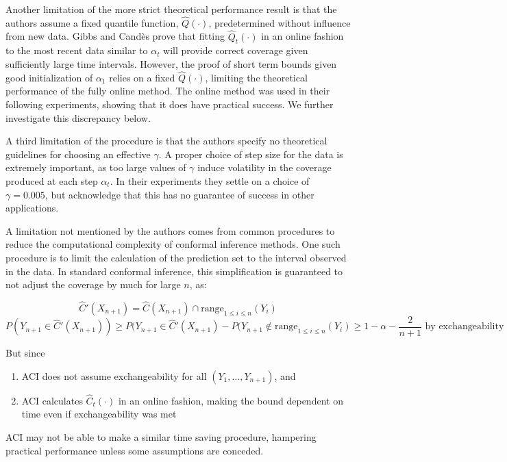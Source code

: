\documentclass[
]{article}
\providecommand{\tightlist}{%
  \setlength{\itemsep}{0pt}\setlength{\parskip}{0pt}}
\begin{document}
Another limitation of the more strict theoretical performance result is
that the authors assume a fixed quantile function, \(\hat{Q}(\cdot)\),
predetermined without influence from new data. Gibbs and Candès prove
that fitting \(\hat{Q}_t(\cdot)\) in an online fashion to the most
recent data similar to \(\alpha_t\) will provide correct coverage given
sufficiently large time intervals. However, the proof of short term
bounds given good initialization of \(\alpha_1\) relies on a fixed
\(\hat{Q}(\cdot)\), limiting the theoretical performance of the fully
online method. The online method was used in their following
experiments, showing that it does have practical success. We further
investigate this discrepancy below.

A third limitation of the procedure is that the authors specify no
theoretical guidelines for choosing an effective \(\gamma\). A proper
choice of step size for the data is extremely important, as too large
values of \(\gamma\) induce volatility in the coverage produced at each
step \(\alpha_t\). In their experiments they settle on a choice of
\(\gamma = 0.005\), but acknowledge that this has no guarantee of
success in other applications.

A limitation not mentioned by the authors comes from common procedures
to reduce the computational complexity of conformal inference methods.
One such procedure is to limit the calculation of the prediction set to
the interval observed in the data. In standard conformal inference, this
simplification is guaranteed to not adjust the coverage by much for
large \(n\), as:

\[ \hat{C}'(X_{n+1}) = \hat{C}(X_{n+1}) \cap \textrm{range}_{ 1 \le i \le n} (Y_i) \]
\[ P(Y_{n+1} \in \hat{C}'(X_{n+1}) ) \ge P(Y_{n+1} \in \hat{C}'(X_{n+1}) - P(Y_{n+1} \notin \textrm{range}_{ 1 \le i \le n} (Y_i)  \ge 1 - \alpha - \frac{2}{n + 1} \textrm{ by exchangeability } \]

But since

\begin{enumerate}
\def\labelenumi{\arabic{enumi}.}
\tightlist
\item
  ACI does not assume exchangeability for all \((Y_1, … , Y_{n+1})\),
  and
\item
  ACI calculates \(\hat{C}_t (\cdot)\) in an online fashion, making the
  bound dependent on time even if exchangeability was met
\end{enumerate}

ACI may not be able to make a similar time saving procedure, hampering
practical performance unless some assumptions are conceded.
\end{document}
